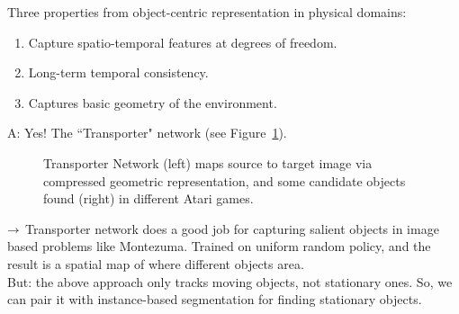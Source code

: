 Three properties from object-centric representation in physical domains:
\begin{enumerate}
    \item Capture spatio-temporal features at degrees of freedom.
    \item Long-term temporal consistency.
    \item Captures basic geometry of the environment.
\end{enumerate}

A: Yes! The ``Transporter" network (see Figure~\ref{fig:transporter}). %

\begin{figure}[h!]
    \centering
     \hspace{5mm}
    \caption{Transporter Network (left) maps source to target image via compressed geometric representation, and some candidate objects found (right) in different Atari games.}
    \label{fig:transporter}
\end{figure}

$\rightarrow$ Transporter network does a good job for capturing salient objects in image based problems like Montezuma. Trained on uniform random policy, and the result is a spatial map of where different objects area. \\

But: the above approach only tracks moving objects, not stationary ones. So, we can pair it with instance-based segmentation for finding stationary objects. \\

